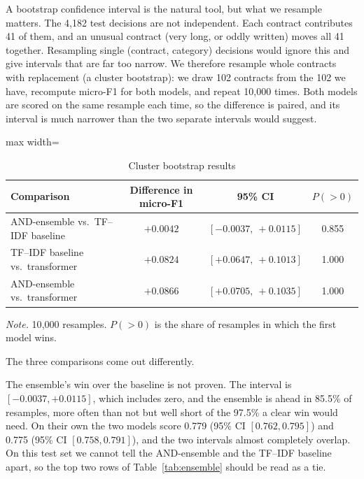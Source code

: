 A bootstrap confidence interval is the natural tool, but what we resample matters. The 4{,}182 test decisions are not independent. Each contract contributes 41 of them, and an unusual contract (very long, or oddly written) moves all 41 together. Resampling single (contract, category) decisions would ignore this and give intervals that are far too narrow. We therefore resample whole contracts with replacement (a cluster bootstrap): we draw 102 contracts from the 102 we have, recompute micro-F1 for both models, and repeat 10{,}000 times. Both models are scored on the same resample each time, so the difference is paired, and its interval is much narrower than the two separate intervals would suggest.

\begin{table}[!htbp]
\centering
\caption{Cluster bootstrap results}
\label{tab:bootstrap}
\small
\begin{adjustbox}{max width=\textwidth}
\begin{tabular}{lccc}
\toprule
\textbf{Comparison} & \textbf{Difference in micro-F1} & \textbf{95\% CI} & \textbf{$P(>0)$}\\
\midrule
AND-ensemble vs.\ TF--IDF baseline & $+0.0042$ & $[-0.0037,\ +0.0115]$ & 0.855\\
TF--IDF baseline vs.\ transformer  & $+0.0824$ & $[+0.0647,\ +0.1013]$ & 1.000\\
AND-ensemble vs.\ transformer      & $+0.0866$ & $[+0.0705,\ +0.1035]$ & 1.000\\
\bottomrule
\end{tabular}
\end{adjustbox}

{\footnotesize\singlespacing \emph{Note.} 10{,}000 resamples. $P(>0)$ is the share of resamples in which the first model wins.\par}
\end{table}

The three comparisons come out differently.

The ensemble's win over the baseline is not proven. The interval is $[-0.0037,\allowbreak +0.0115]$, which includes zero, and the ensemble is ahead in 85.5\% of resamples, more often than not but well short of the 97.5\% a clear win would need. On their own the two models score 0.779 (95\% CI $[0.762, 0.795]$) and 0.775 (95\% CI $[0.758, 0.791]$), and the two intervals almost completely overlap. On this test set we cannot tell the AND-ensemble and the TF--IDF baseline apart, so the top two rows of Table~\ref{tab:ensemble} should be read as a tie.

